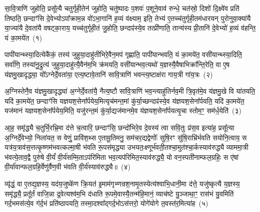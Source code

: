 
\setcounter{anuvakam}{0}
सा॒वि॒त्राणि॑ जुहोति॒ प्रसू᳚त्यै चतुर्गृही॒तेन॑ जुहोति॒ चतु॑ष्पादः प॒शवः॑ प॒शूने॒वाव॑ रुन्धे॒ चत॑स्रो॒ दिशो॑ दि॒क्ष्वे॑व प्रति॑ तिष्ठति॒ छन्दाꣳ॑सि दे॒वेभ्यो\-ऽपा᳚क्राम॒न्न वो॑\-ऽभा॒गानि॑ ह॒व्यं व॑क्ष्याम॒ इति॒ तेभ्य॑ ए॒तच्च॑तुर्गृही॒तम॑धारयन् पुरोनुवा॒क्या॑यै या॒ज्या॑यै दे॒वता॑यै वषट्का॒राय॒ यच्च॑तुर्गृही॒तं जु॒होति॒ छन्दाꣴ॑स्ये॒व तत्प्री॑णाति॒ तान्य॑स्य प्री॒तानि॑ दे॒वेभ्यो॑ ह॒व्यं व॑हन्ति॒ यं का॒मये॑त~(१)

पापी॑यान्थ्स्या॒दित्येकै॑कं॒ तस्य॑ जुहुया॒दाहु॑तीभिरे॒वैन॒मप॑ गृह्णाति॒ पापी॑यान्भवति॒ यं का॒मये॑त॒ वसी॑यान्थ्स्या॒दिति॒ सर्वा॑णि॒ तस्या॑नु॒द्रुत्य॑ जुहुया॒दाहु॑त्यै॒वैन॑म॒भि क्र॑मयति॒ वसी॑यान्भव॒त्यथो॑ य॒ज्ञस्यै॒वैषाभिक्रा᳚न्ति॒रेति॒ वा ए॒ष य॑ज्ञमु॒खादृद्ध्या॒ यो᳚\-ऽग्नेर्दे॒वता॑या॒ एत्य॒ष्टावे॒तानि॑ सावि॒त्राणि॑ भवन्त्य॒ष्टाक्ष॑रा गाय॒त्री गा॑य॒त्रः~(२)

अ॒ग्निस्तेनै॒व य॑ज्ञमु॒खादृद्ध्या॑ अ॒ग्नेर्दे॒वता॑यै॒ नैत्य॒ष्टौ सा॑वि॒त्राणि॑ भव॒न्त्याहु॑तिर्नव॒मी त्रि॒वृत॑मे॒व य॑ज्ञमु॒खे वि या॑तयति॒ यदि॑ का॒मये॑त॒ छन्दाꣳ॑सि यज्ञयश॒सेना᳚र्पयेय॒मित्यृच॑मन्त॒मां कु॑र्या॒च्छन्दाꣴ॑स्ये॒व य॑ज्ञयश॒सेना᳚र्पयति॒ यदि॑ का॒मये॑त॒ यज॑मानं यज्ञयश॒सेना᳚र्पयेय॒मिति॒ यजु॑रन्त॒मं कु॑र्या॒द्यज॑मानमे॒व य॑ज्ञयश॒सेना᳚र्पयत्यृ॒चा स्तोम॒ꣳ॒ सम॑र्ध॒येति॑~(३)

आ॒ह॒ समृ॑द्ध्यै च॒तुर्भि॒रभ्रि॒मा द॑त्ते च॒त्वारि॒ छन्दाꣳ॑सि॒ छन्दो॑भिरे॒व दे॒वस्य॑ त्वा सवि॒तुः प्र॑स॒व इत्या॑ह॒ प्रसू᳚त्या अ॒ग्निर्दे॒वेभ्यो॒ निला॑यत॒ स वेणुं॒ प्रावि॑श॒थ्स ए॒तामू॒तिमनु॒ सम॑चर॒द्यद्वेणोः᳚ सुषि॒रꣳ सु॑षि॒राभ्रि॑र्भवति सयोनि॒त्वाय॒ स यत्र॑य॒त्राव॑स॒त्तत्कृ॒ष्णम॑भवत्कल्मा॒षी भ॑वति रू॒पस॑मृद्ध्या उभयतः॒क्ष्णूर्भ॑वती॒तश्चा॒मुत॑श्चा॒र्कस्याव॑रुद्ध्यै व्याममा॒त्री भ॑वत्ये॒ताव॒द्वै पुरु॑षे वी॒र्यं॑ वी॒र्य॑सम्मि॒ता\-ऽप॑रिमिता भव॒त्यप॑रिमित॒स्याव॑रुद्ध्यै॒ यो वन॒स्पती॑नाम्फल॒ग्रहिः॒ स ए॑षां वी॒र्या॑वान्फल॒ग्रहि॒र्वेणु॑र्वैण॒वी भ॑वति वी॒र्य॑स्याव॑रुद्ध्यै॥~(४)

{\anuvakamend[{का॒मये॑त गाय॒त्रो᳚\-ऽर्ध॒येति॑ च स॒प्तविꣳ॑शतिश्च}]}%

व्यृ॑द्धं॒ वा ए॒तद्य॒ज्ञस्य॒ यद॑य॒जुष्के॑ण क्रि॒यत॑ इ॒माम॑गृभ्णन्रश॒नामृ॒तस्येत्य॑श्वाभि॒धानी॒मा द॑त्ते॒ यजु॑ष्कृत्यै य॒ज्ञस्य॒ समृ॑द्ध्यै॒ प्रतू᳚र्तं वाजि॒न्ना द्र॒वेत्यश्व॑म॒भि द॑धाति रू॒पमे॒वास्यै॒तन्म॑हि॒मानं॒ व्याच॑ष्टे यु॒ञ्जाथा॒ꣳ॒ रास॑भं यु॒वमिति॑ गर्द॒भमस॑त्ये॒व ग॑र्द॒भं प्रति॑\-ष्ठापयति॒ तस्मा॒दश्वा᳚द्गर्द॒भो\-ऽस॑त्तरो॒ योगे॑योगे त॒वस्त॑र॒मित्या॑ह~(५)

